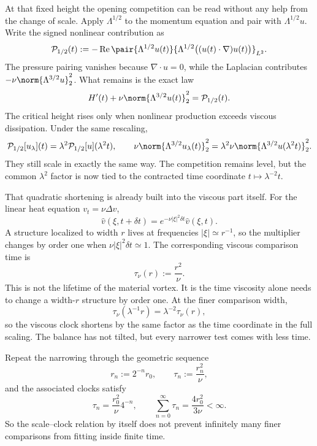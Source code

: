 
At that fixed height the opening competition can be read without any help from the change of scale. Apply \(\Lambda^{1/2}\) to the momentum equation and pair with \(\Lambda^{1/2}u\). Write the signed nonlinear contribution as
\[
  \mathcal P_{1/2}(t)
  :=
  -\operatorname{Re}
  \pair
    {\Lambda^{1/2}u(t)}
    {\Lambda^{1/2}\bigl((u(t)\cdot\nabla)u(t)\bigr)}_{L^2}.
\]
The pressure pairing vanishes because \(\nabla\cdot u=0\), while the Laplacian contributes \(-\nu\norm{\Lambda^{3/2}u}_2^2\). What remains is the exact law
\[
  H'(t)
  +
  \nu\norm{\Lambda^{3/2}u(t)}_2^2
  =
  \mathcal P_{1/2}(t).
\]
The critical height rises only when nonlinear production exceeds viscous dissipation. Under the same rescaling,
\[
  \mathcal P_{1/2}[u_\lambda](t)
  =
  \lambda^2\mathcal P_{1/2}[u](\lambda^2t),
  \qquad
  \nu\norm{\Lambda^{3/2}u_\lambda(t)}_2^2
  =
  \lambda^2\nu\norm{\Lambda^{3/2}u(\lambda^2t)}_2^2.
\]
They still scale in exactly the same way. The competition remains level, but the common \(\lambda^2\) factor is now tied to the contracted time coordinate \(t\mapsto\lambda^{-2}t\).


That quadratic shortening is already built into the viscous part itself. For the linear heat equation \(v_t=\nu\Delta v\),
\[
  \widehat v(\xi,t+\delta t)
  =
  e^{-\nu|\xi|^2\delta t}\widehat v(\xi,t).
\]
A structure localized to width \(r\) lives at frequencies \(|\xi|\simeq r^{-1}\), so the multiplier changes by order one when \(\nu|\xi|^2\delta t\simeq1\). The corresponding viscous comparison time is
\[
  \tau_\nu(r)
  :=
  \frac{r^2}{\nu}.
\]
This is not the lifetime of the material vortex. It is the time viscosity alone needs to change a width-\(r\) structure by order one. At the finer comparison width,
\[
  \tau_\nu(\lambda^{-1}r)
  =
  \lambda^{-2}\tau_\nu(r),
\]
so the viscous clock shortens by the same factor as the time coordinate in the full \NavierStokes{} scaling. The balance has not tilted, but every narrower test comes with less time.


Repeat the narrowing through the geometric sequence
\[
  r_n:=2^{-n}r_0,
  \qquad
  \tau_n:=\frac{r_n^2}{\nu},
\]
and the associated clocks satisfy
\[
  \tau_n
  =
  \frac{r_0^2}{\nu}4^{-n},
  \qquad
  \sum_{n=0}^{\infty}\tau_n
  =
  \frac{4r_0^2}{3\nu}
  <
  \infty.
\]
So the scale--clock relation by itself does not prevent infinitely many finer comparisons from fitting inside finite time.


